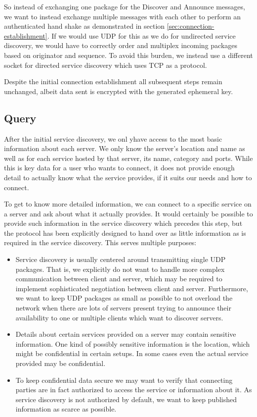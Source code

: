 So instead of exchanging one package for the Discover and Announce messages, we want to instead exchange multiple messages with each other to perform an authenticated hand shake as demonstrated in section \ref{sec:connection-establishment}.
If we would use UDP for this as we do for undirected service discovery, we would have to correctly order and multiplex incoming packages based on originator and sequence.
To avoid this burden, we instead use a different socket for directed service discovery which uses TCP as a protocol.

Despite the initial connection establishment all subsequent steps remain unchanged, albeit data sent is encrypted with the generated ephemeral key.

\subsection{Query}
\label{sec:query}

After the initial service discovery, we onl yhave access to the most basic information about each server.
We only know the server's location and name as well as for each service hosted by that server, its name, category and ports.
While this is key data for a user who wants to connect, it does not provide enough detail to actually know what the service provides, if it suits our needs and how to connect.

To get to know more detailed information, we can connect to a specific service on a server and ask about what it actually provides.
It would certainly be possible to provide such information in the service discovery which precedes this step, but the protocol has been explicitly designed to hand over as little information as is required in the service discovery.
This serves multiple purposes:
\begin{itemize}
    \item Service discovery is usually centered around transmitting single UDP packages.
        That is, we explicitly do not want to handle more complex communication between client and server, which may be required to implement sophisticated negotiation between client and server.
        Furthermore, we want to keep UDP packages as small as possible to not overload the network when there are lots of servers present trying to announce their availability to one or multiple clients which want to discover servers.
    \item Details about certain services provided on a server may contain sensitive information.
        One kind of possibly sensitive information is the location, which might be confidential in certain setups.
        In some cases even the actual service provided may be confidential.
    \item To keep confidential data secure we may want to verify that connecting parties are in fact authorized to access the service or information about it.
        As service discovery is not authorized by default, we want to keep published information as scarce as possible.
\end{itemize}

